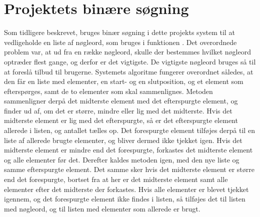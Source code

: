 \section{Projektets binære søgning}
Som tidligere beskrevet, bruges binær søgning i dette projekts system til at vedligeholde en liste af nøgleord, som bruges i funktionen . Det overordnede problem var, at ud fra en række nøgleord, skulle der bestemmes hvilket nøgleord optræder flest gange, og derfor er det vigtigste. De vigtigste nøgleord bruges så til at foreslå tilbud til brugerne. Systemets algoritme fungerer overordnet således, at den får en liste med elementer, en start- og en slutposition, og et element som efterspørges, samt de to elementer som skal sammenlignes. Metoden sammenligner derpå det midterste element med det efterspurgte element, og finder ud af, om det er større, mindre eller lig med det midterste. Hvis det midterste element er lig med det efterspurgte, så er det efterspurgte element allerede i listen, og antallet tælles op. Det forespurgte element tilføjes derpå til en liste af allerede brugte elementer, og bliver dermed ikke tjekket igen. Hvis det midterste element er mindre end det forespurgte, forkastes det midterste element og alle elementer før det. Derefter kaldes metoden igen, med den nye liste og samme efterspurgte element. Det samme sker hvis det midterste element er større end det forespurgte, bortset fra at her er det midterste element samt alle elementer efter det midterste der forkastes. Hvis alle elementer er blevet tjekket igennem, og det forespurgte element ikke findes i listen, så tilføjes det til listen med nøgleord, og til listen med elementer som allerede er brugt. 